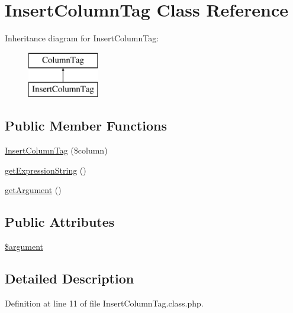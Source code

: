 \hypertarget{classInsertColumnTag}{\section{Insert\+Column\+Tag Class Reference}
\label{classInsertColumnTag}
}
Inheritance diagram for Insert\+Column\+Tag\+:\begin{figure}[H]
\begin{center}
\leavevmode
\includegraphics[height=2.000000cm]{classInsertColumnTag}
\end{center}
\end{figure}
\subsection*{Public Member Functions}
\begin{DoxyCompactItemize}
\item 
\hyperlink{classInsertColumnTag_a7ca1654435b7a6e73d269f9e4f50e119}{Insert\+Column\+Tag} (\$column)
\item 
\hyperlink{classInsertColumnTag_a77e3aba891447e4d9fddc8a91c6ca9da}{get\+Expression\+String} ()
\item 
\hyperlink{classInsertColumnTag_a951d60b78c53d03e3921c1082502ccc4}{get\+Argument} ()
\end{DoxyCompactItemize}
\subsection*{Public Attributes}
\begin{DoxyCompactItemize}
\item 
\hyperlink{classInsertColumnTag_a1aa52b3296f70706efacf27d1a1abc6c}{\$argument}
\end{DoxyCompactItemize}


\subsection{Detailed Description}


Definition at line 11 of file Insert\+Column\+Tag.\+class.\+php.



